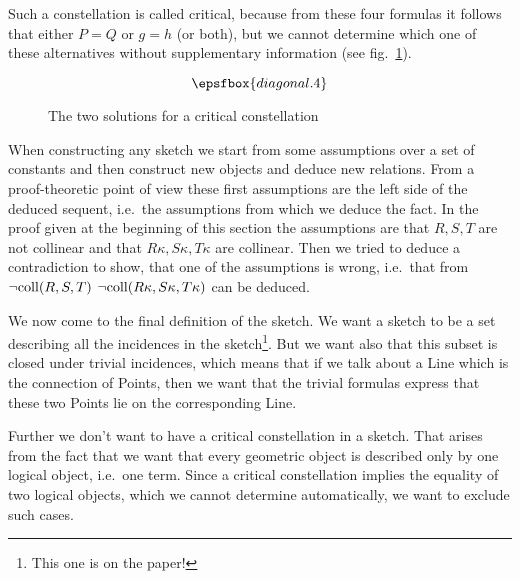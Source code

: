 Such a constellation is called critical, because from these four
formulas it follows that either $P=Q$ or $g=h$ (or both), but we
cannot determine which one of these alternatives without supplementary
information (see fig.~\ref{skizze:critical}).

\begin{figure}[ht]
  \[\epsfbox{diagonal.4}\]
  \caption{The two solutions for a critical constellation}
  \label{skizze:critical}
\end{figure}

When constructing any sketch we start from some assumptions over a set
of constants and then construct new objects and deduce new relations.
From a proof-theoretic point of view these first assumptions are the
left side of the deduced sequent, i.e.\ the assumptions from which we
deduce the fact. In the proof given at the beginning of this section
the assumptions are that $R,S,T$ are not collinear and that $R\kappa,
S\kappa, T\kappa$ are collinear. Then we tried to deduce a
contradiction to show, that one of the assumptions is wrong, i.e.\ that
from $\lnot\mathrm{coll}(R,S,T)$ $\lnot\mathrm{coll}(R\kappa,S\kappa,T\kappa)$ can be
deduced.

We now come to the final definition of the sketch. We want a
sketch to be a set describing all the incidences in the
sketch\footnote{This one is on the paper!}. But we want also that this
subset is closed under trivial incidences, which means that if we talk
about a Line which is the connection of Points, then we want that the
trivial formulas express that these two Points lie on the
corresponding Line.

Further we don't want to have a critical constellation in a sketch.
That arises from the fact that we want that every geometric object is
described only by one logical object, i.e.\ one term. Since a critical
constellation implies the equality of two logical objects, which we
cannot determine automatically, we want to exclude such cases.

